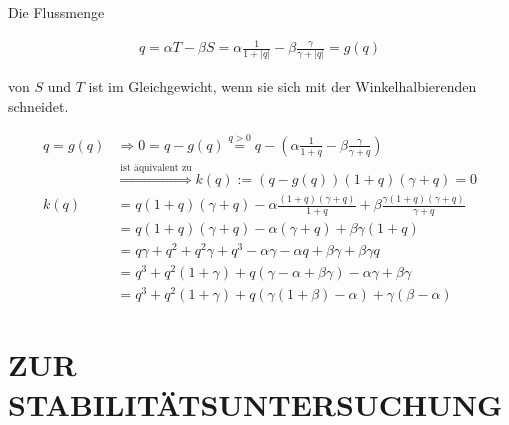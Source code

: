 \documentclass[a4paper,twoside]{article}
\begin{document}
	Die Flussmenge 

	\begin{footnotesize}
	\begin{align*}
		q = \alpha T - \beta S
		 = \alpha \frac{1}{1+|q|} - \beta \frac{\gamma}{\gamma + |q|} = g(q)
	\end{align*}
	\end{footnotesize}
	
	von \(S\) und \(T\) ist im Gleichgewicht, wenn sie sich mit der Winkelhalbierenden schneidet.
	

	\begin{footnotesize}
	\begin{align*}
		q = g(q) &\Rightarrow 0 = q - g(q) \stackrel{q > 0}{=}  q - \left(\alpha \frac{1}{1+q} - \beta \frac{\gamma}{\gamma + q} \right) \\
		& \stackrel{\textrm{ist äquivalent zu}}{\Rightarrow}
		k(q) := \left( q - g(q) \right) (1+q) (\gamma + q) = 0 \\
		k(q) &= q(1+q) (\gamma + q) - \alpha \frac{(1+q) (\gamma + q)}{1+q} + \beta \frac{\gamma (1+q) (\gamma + q)}{\gamma + q} \\
		&= q(1+q) (\gamma + q) - \alpha (\gamma + q) + \beta \gamma (1+q) \\
		&= q \gamma + q^2 + q^2 \gamma + q^3 - \alpha \gamma - \alpha q + \beta \gamma + \beta \gamma q \\
		&= q^3 + q^2(1 + \gamma) + q(\gamma - \alpha + \beta \gamma) - \alpha \gamma + \beta \gamma \\
		&= q^3 + q^2(1 + \gamma) + q\left(\gamma \left(1 + \beta\right) - \alpha \right) + \gamma \left( \beta - \alpha \right)
	\end{align*}
	\end{footnotesize}

		\section*{\uppercase{Zur Stabilitätsuntersuchung}\label{sec: Stabilitaetsuntersuchung}}
\end{document}
